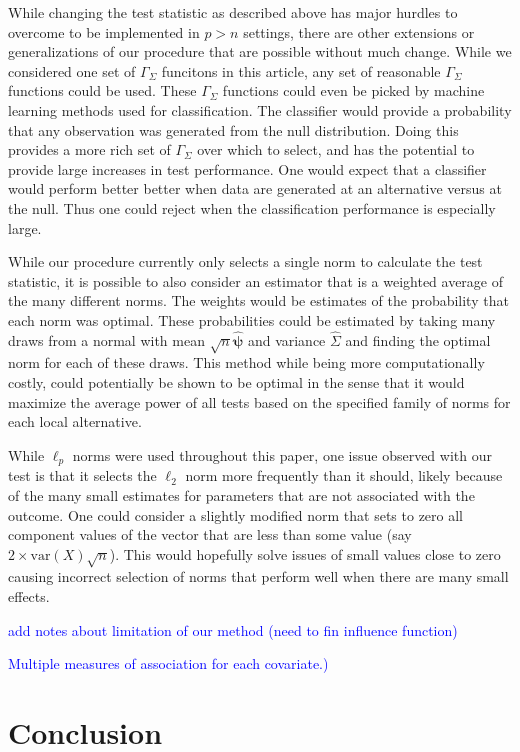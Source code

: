\documentclass{article}
\newcommand{\Gammaf}{\Gamma_{\Sigma}}
\begin{document}
While changing the test statistic as described above has major hurdles to overcome to be implemented in $p > n$ settings, there are other extensions or generalizations of our procedure that are possible without much change.  While we considered one set of $\Gammaf$ funcitons in this article, any set of reasonable $\Gammaf$ functions could be used.  These $\Gammaf$ functions could even be picked by machine learning methods used for classification.  The classifier would provide a probability that any observation was generated from the null distribution.  Doing this provides a more rich set of $\Gammaf$ over which to select, and has the potential to provide large increases in test performance.  One would expect that a classifier would perform better better when data are generated at an alternative versus at the null.  Thus one could reject when the classification performance is especially large.  

While our procedure currently only selects a single norm to calculate the test statistic, it is possible to also consider an estimator that is a weighted average of the many different norms.  The weights would be estimates of the probability that each norm was optimal. These probabilities could be estimated by taking many draws from a normal with mean $\sqrt{n}\hat{\boldsymbol{\psi}}$ and variance $\hat{\Sigma}$ and finding the optimal norm for each of these draws.  This method while being more computationally costly, could potentially be shown to be optimal in the sense that it would maximize the average power of all tests based on the specified family of norms for each local alternative. 

While $\ell_p$ norms were used throughout this paper, one issue observed with our test is that it selects the $\ell_2$ norm more frequently than it should, likely because of the many small estimates for parameters that are not associated with the outcome.  One could consider a slightly modified norm that sets to zero all component values of the vector that are less than some value (say $2 \times \text{var}(X)\sqrt{n}$).  This would hopefully solve issues of small values close to zero causing incorrect selection of norms that perform well when there are many small effects.

\textcolor{blue}{add notes about limitation of our method (need to fin influence function)}

\textcolor{blue}{Multiple measures of association for each covariate.)}

\section{Conclusion}
\end{document}

